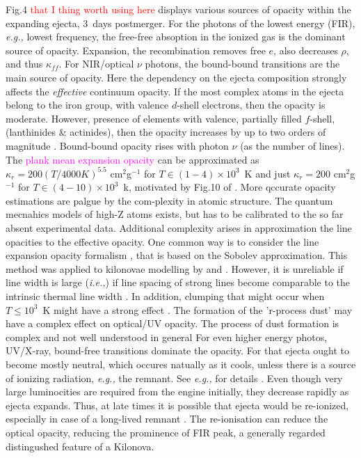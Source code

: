 \documentclass[11pt,a4paper,headinclude=true,DIV=14,BCOR=8mm,chapterprefix,listof=totoc,twoside,openright,abstracton]{scrbook}
\newcommand{\red}[1]{\textcolor{red}{#1}}
\newcommand{\magenta}[1]{\textcolor{magenta}{#1}} %
\begin{document}
Fig.4 \red{that I thing worth using here} displays various sources of opacity within the expanding ejecta, $3$~days postmerger.
For the photons of the lowest energy (FIR), \textit{e.g.,} lowest frequency, the free-free absoption in the ionized gas is the dominant source of opacity. Expansion, the recombination removes free $e$, also decreases $\rho$, and thus $\kappa_{ff}$. 
For NIR/optical $\nu$ photons, the bound-bound transitions are the main source of opacity. Here the dependency on the ejecta composition strongly affects the \textit{effective} continuum opacity. If the most complex atoms in the ejecta belong to the iron group, with valence $d$-shell electrons, then the opacity is moderate. However, presence of elements with valence, partially filled $f$-shell, (lanthinides \& actinides), then the opacity increases by up to two orders of magnitude \cite{(Kasen et al 2013; Tanaka and Hotokezaka 2013; Fontes et al 2015, 2017)}. Bound-bound opacity rises with photon $\nu$ (as the number of lines).
The \magenta{plank mean expansion opacity} can be approximated as $\kappa_r = 200 (T/4000K)^{5.5}$ cm$^2$g$^{-1}$ for $T\in(1-4)\times10^3$~K and just $\kappa_r=200$ cm$^2$g$^{-1}$ for $T\in(4-10)\times10^{3}$~k, motivated by Fig.10 of \cite{Kasen et al (2013)}. More qccurate opacity estimations are palgue by the com-plexity in atomic structure. The quantum mecnahics models of high-Z atoms exists, but has to be calibrated to the so far absent experimental data.
Additional complexity arises in approximation the line opacities to the effective opacity.
One common way is to consider the line expansion opacity formalism \cite{Pinto and Eastman 2000}, that is based on the Sobolev approximation. This method was applied to kilonovae modelling by \cite{Barnes and Kasen (2013)} and \cite{Tanaka and Hotokezaka (2013)}. However, it is unreliable if line width is large (\textit{i.e.,}) if line spacing of strong lines become comparable to the intrinsic thermal line width \cite{(Kasen et al 2013; Fontes et al 2015, 2017).}. 
In addition, clumping that might occur when $T\leq10^3$~K might have a strong effect \cite{(Takami et al 2014)}. The formation of the 'r-process dust' may have a complex effect on optical/UV opacity. The process of dust formation is complex and not well understood in general \cite{(Cherchne and Dwek 2009; Lazzati and Heger 2016)}
For even higher energy photos, UV/X-ray, bound-free transitions dominate the opacity. For that ejecta ought to become mostly neutral, which occures natually as it cools, unless there is a source of ionizing radiation, \textit{e.g.,} the remnant. See \textit{e.g.,} for details \cite{Metzger and Piro (2014)}. Even though very large luminocities are required from the engine initially, they decrease rapidly as ejecta expands. Thus, at late times it is possible that ejecta would be re-ionized, especially in case of a long-lived remnant \cite{Metzger and Piro 2014)}. The re-ionisation can reduce the optical opacity, reducing the prominence of FIR peak, a generally regarded distingushed feature of a Kilonova.
\end{document}
